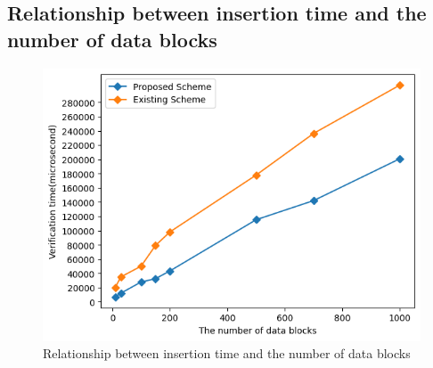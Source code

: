 \subsection{Relationship between insertion time and the number of data blocks}

\begin{figure}[H]
    \centering
    \includegraphics[scale=0.8]{figures/verification diff.png}
    \caption{Relationship between insertion time and the number of data blocks}
 
\end{figure}
\vspace{0.5cm}